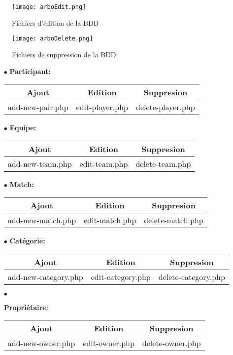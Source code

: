 \documentclass{article}
\begin{document}
\begin{figure}[h!]
\centering
\texttt{[image: arboEdit.png]}
\caption{Fichiers d'édition de la BDD}
\end{figure}

\begin{figure}[h!]
\centering
\texttt{[image: arboDelete.png]}
\caption{Fichiers de suppression de la BDD}
\end{figure}

\begin{itemize}
\item[$\bullet$]{\textbf{Participant: }}
\begin{tabular}{ccc}
 Ajout & Edition & Suppresion \\
 \hline
add-new-pair.php & edit-player.php & delete-player.php\\
\end{tabular}

\item[$\bullet$]{\textbf{Equipe: }}
\begin{tabular}{ccc}
 Ajout & Edition & Suppresion \\
 \hline
add-new-team.php & edit-team.php & delete-team.php\\
\end{tabular}

\item[$\bullet$]{\textbf{Match: }}
\begin{tabular}{ccc}
 Ajout & Edition & Suppresion \\
 \hline
add-new-match.php & edit-match.php & delete-match.php\\
\end{tabular}

\item[$\bullet$]{\textbf{Catégorie: }}
\begin{tabular}{ccc}
 Ajout & Edition & Suppresion \\
 \hline
add-new-category.php & edit-category.php & delete-category.php\\
\end{tabular}

\item[$\bullet$]{\textbf{Propriétaire: }
\begin{tabular}{ccc}
 Ajout & Edition & Suppresion \\
 \hline
add-new-owner.php & edit-owner.php & delete-owner.php\\
\end{tabular}

}
\end{itemize}
\end{document}
